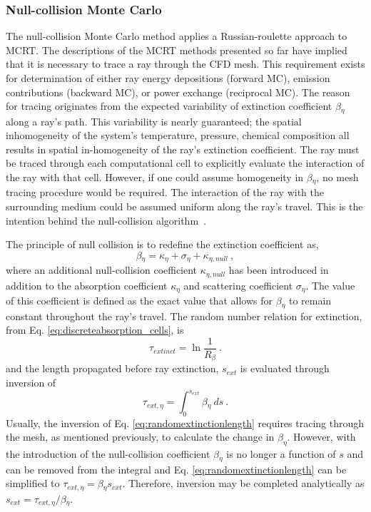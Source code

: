\subsubsection{Null-collision Monte Carlo}
The null-collision Monte Carlo method applies a Russian-roulette approach to MCRT.
The descriptions of the MCRT methods presented so far have implied that it is necessary to trace a ray through the CFD mesh.
This requirement exists for determination of either ray energy depositions (forward MC), emission contributions (backward MC), or power exchange (reciprocal MC). 
The reason for tracing originates from the expected variability of extinction coefficient $\beta{}_\eta{}$ along a ray's path. 
This variability is nearly guaranteed; the spatial inhomogeneity of the system's temperature, pressure, chemical composition all results in spatial in-homogeneity of the ray's extinction coefficient. 
The ray must be traced through each computational cell to explicitly evaluate the interaction of the ray with that cell.
However, if one could assume homogeneity in $\beta{}_\eta{}$, no mesh tracing procedure would be required. The interaction of the ray with the surrounding medium could be assumed uniform along the ray's travel.
This is the intention behind the null-collision algorithm~\cite{Galtier2013IntegralAlgorithms,Eymet2013Null-collisionSimulators}.

The principle of null collision is to redefine the extinction coefficient as,
\begin{equation}
    \beta{}_\eta{} = \kappa{}_\eta{}+\sigma{}_\eta+\kappa{}_{\eta{},null}~,
    \label{eq:null_coll_absco}
\end{equation}
where an additional null-collision coefficient $\kappa{}_{\eta,null}$ has been introduced in addition to the absorption coefficient $\kappa{}_\eta$ and scattering coefficient $\sigma{}_\eta{}$. 
The value of this coefficient is defined as the exact value that allows for $\beta{}_\eta{}$ to remain constant throughout the ray's travel.
The random number relation for extinction, from Eq. \ref{eq:discreteabsorption_cells}, is 
\begin{equation}
    \tau_{extinct} = \ln{\frac{1}{R_\beta{}}}~.
    \label{eq:discreteabsorption_cells_repeated}
\end{equation}
and the length propagated before ray extinction, $s_{ext}$ is evaluated through inversion of
\begin{equation}
    \tau_{ext,\eta{}} = \int_0^{s_{ext}}{\beta{}_\eta{}~ds}~.
    \label{eq:randomextinctionlength}
\end{equation}
Usually, the inversion of Eq. \ref{eq:randomextinctionlength} requires tracing through the mesh, as mentioned previously, to calculate the change in $\beta_\eta$. However, with the introduction of the null-collision coefficient $\beta{}_\eta{}$ is no longer a function of $s$ and can be removed from the integral and Eq. \ref{eq:randomextinctionlength} can be simplified to $\tau{}_{ext,\eta}=\beta{}_\eta{}s_{ext}$. Therefore, inversion may be completed analytically as $s_{ext}=\tau{}_{ext,\eta}/\beta{}_\eta{}$.
 
